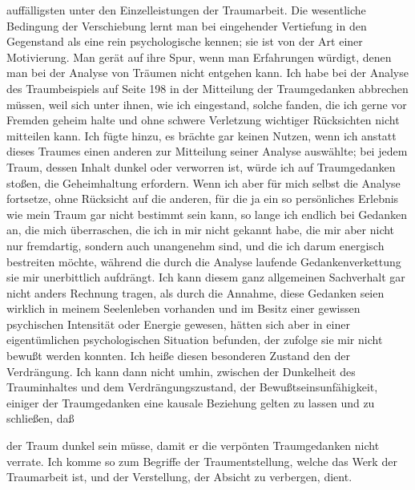 \documentclass[twoside=true,titlepage=false,open=any, parskip=never, fontsize=10pt, headings=small, chapterprefix=false, appendixprefix=false]{scrbook}
\begin{document}
        \pstart
        auffälligsten unter den Einzelleistungen der Traumarbeit. Die
               wesentliche Bedingung der Verschiebung lernt man bei eingehender
               Vertiefung in den Gegenstand als eine rein psychologische kennen; sie ist von
               der Art einer Motivierung. Man gerät auf ihre
               Spur, wenn man Erfahrungen würdigt, denen man bei der Analyse von Träumen nicht
               entgehen kann. Ich habe bei der Analyse des Traumbeispiels auf Seite 198 in der
               Mitteilung der Traumgedanken abbrechen müssen, weil sich unter ihnen, wie
               ich eingestand, solche fanden, die ich gerne vor Fremden geheim halte und ohne
               schwere Verletzung wichtiger Rücksichten nicht mitteilen kann. Ich fügte hinzu,
               es brächte gar keinen Nutzen, wenn ich anstatt dieses Traumes einen anderen zur
                  Mitteilung seiner Analyse auswählte; bei jedem Traum, dessen
               Inhalt dunkel oder verworren ist, würde ich auf Traumgedanken stoßen, die
               Geheimhaltung erfordern. Wenn ich aber für mich selbst die Analyse fortsetze,
               ohne Rücksicht auf die anderen, für die ja ein so persönliches Erlebnis wie mein
               Traum gar nicht bestimmt sein kann, so lange ich endlich bei Gedanken an,
               die mich überraschen, die ich in mir nicht gekannt habe, die mir aber nicht
                  nur fremdartig, sondern auch unangenehm sind, und die ich darum energisch bestreiten möchte, während die
               durch die Analyse laufende Gedankenverkettung sie mir unerbittlich aufdrängt.
               Ich kann diesem ganz allgemeinen Sachverhalt gar nicht anders Rechnung tragen,
               als durch die Annahme, diese Gedanken seien wirklich in meinem Seelenleben
               vorhanden und im Besitz einer gewissen psychischen Intensität oder Energie
               gewesen, hätten sich aber in einer eigentümlichen psychologischen Situation
               befunden, der zufolge sie mir nicht bewußt werden
               konnten. Ich heiße diesen besonderen Zustand den der Verdrängung. Ich kann dann nicht umhin, zwischen der Dunkelheit des
               Trauminhaltes und dem Verdrängungszustand, der Bewußtseinsunfähigkeit, einiger der Traumgedanken eine kausale
               Beziehung gelten zu lassen und zu schließen, daß
        \pend
    
         
            
            
            
        \pstart
        der Traum dunkel sein müsse, damit er die
                  verpönten Traumgedanken nicht verrate. Ich komme so zum Begriffe der Traumentstellung, welche das Werk der Traumarbeit
               ist, und der Verstellung, der Absicht zu
               verbergen, dient.
        \pend
    
\end{document}
